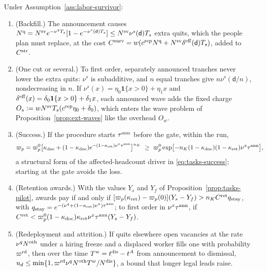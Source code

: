 \begin{proposition}\label{prop:labor-survivor}
Under Assumption~\ref{ass:labor-survivor}:
\begin{enumerate}
\item[(a)] (Backfill.) The announcement causes $N^{\rm q}=N^{\rm sv}e^{-\nu^qT_s}[1-e^{-\nu^s(\mathsf d)T_s}]\le N^{\rm sv}\nu^s(\mathsf d)T_s$ extra quits, which the people plan must replace, at the cost $C^{\rm surv}=w(c^{\rm rep}N^{\rm q}+N^{\rm sv}\delta^{\rm eff}(\mathsf d)T_s)$, added to $C^{\rm str}$.
\item[(b)] (One cut or several.) To first order, separately announced tranches never lower the extra quits: $\nu^s$ is subadditive, and $n$ equal tranches give $n\nu^s(\mathsf d/n)$, nondecreasing in $n$. If $\nu^s(x)=\eta_0\mathbf 1\{x>0\}+\eta_1x$ and $\delta^{\rm eff}(x)=\delta_0\mathbf 1\{x>0\}+\delta_1x$, each announced wave adds the fixed charge $O_s:=wN^{\rm sv}T_s(c^{\rm rep}\eta_0+\delta_0)$, which enters the wave problem of Proposition~\ref{prop:ext-waves} like the overhead $O_w$.
\item[(c)] (Success.) If the procedure starts $\tau^{\rm ann}$ before the gate, within the run,
\begin{equation}\label{eq:labor-success}
\varpi_p=\varpi^0_p\bigl[\kappa_{\rm doc}+(1-\kappa_{\rm doc})e^{-(1-\kappa_{\rm ret})\nu^x\tau^{\rm ann}}\bigr]^{n_K}\ \ge\ \varpi^0_p\exp\bigl[-n_K(1-\kappa_{\rm doc})(1-\kappa_{\rm ret})\nu^x\tau^{\rm ann}\bigr],
\end{equation}
a structural form of the affected-headcount driver in \eqref{eq:tasks-success}; starting at the gate avoids the loss.
\item[(d)] (Retention awards.) With the values $Y_s$ and $Y_f$ of Proposition~\ref{prop:tasks-pilot}, awards pay if and only if $[\varpi_p(\kappa_{\rm ret})-\varpi_p(0)](Y_s-Y_f)>n_KC^{\rm ret}q_{\rm stay}$, with $q_{\rm stay}=e^{-(\nu^q+(1-\kappa_{\rm ret})\nu^x)\tau^{\rm ann}}$; to first order in $\nu^x\tau^{\rm ann}$, if $C^{\rm ret}<\varpi^0_p(1-\kappa_{\rm doc})\kappa_{\rm ret}\nu^x\tau^{\rm ann}(Y_s-Y_f)$.
\item[(e)] (Redeployment and attrition.) If quits elsewhere open vacancies at the rate $\nu^qN^{\rm oth}$ under a hiring freeze and a displaced worker fills one with probability $\varpi^{\rm rd}$, then over the time $T^w=t^{\rm dis}-t^A$ from announcement to dismissal, $u_d\le\min\{1,\varpi^{\rm rd}\nu^qN^{\rm oth}T^w/N^{\rm dis}\}$, a bound that longer legal leads raise.
\end{enumerate}
\end{proposition}

